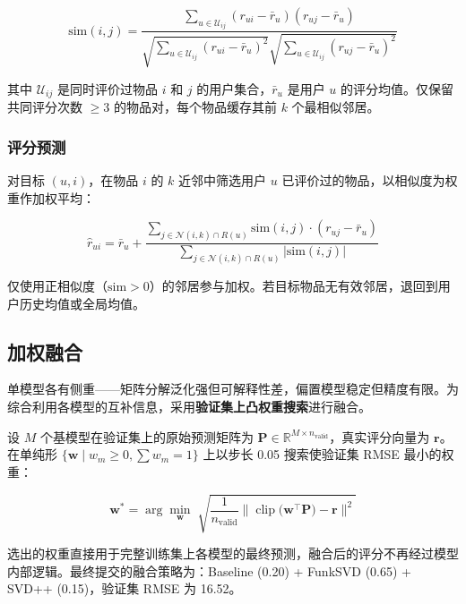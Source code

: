 \documentclass[UTF8,a4paper,10pt]{ctexart}
\begin{document}
\begin{equation}
    \text{sim}(i, j) = \frac{
        \sum_{u \in \mathcal{U}_{ij}} (r_{ui} - \bar{r}_u)(r_{uj} - \bar{r}_u)
    }{
        \sqrt{\sum_{u \in \mathcal{U}_{ij}} (r_{ui} - \bar{r}_u)^2}
        \sqrt{\sum_{u \in \mathcal{U}_{ij}} (r_{uj} - \bar{r}_u)^2}
    }
    \label{eq:knn_sim}
\end{equation}

其中 $\mathcal{U}_{ij}$ 是同时评价过物品 $i$ 和 $j$ 的用户集合，$\bar{r}_u$ 是用户 $u$ 的评分均值。仅保留共同评分次数 $\geq 3$ 的物品对，每个物品缓存其前 $k$ 个最相似邻居。

\subsubsection{评分预测}

对目标 $(u,i)$，在物品 $i$ 的 $k$ 近邻中筛选用户 $u$ 已评价过的物品，以相似度为权重作加权平均：

\begin{equation}
    \hat{r}_{ui} = \bar{r}_u + \frac{
        \sum_{j \in \mathcal{N}(i,k) \cap R(u)} \text{sim}(i,j) \cdot (r_{uj} - \bar{r}_u)
    }{
        \sum_{j \in \mathcal{N}(i,k) \cap R(u)} |\text{sim}(i,j)|
    }
    \label{eq:knn_pred}
\end{equation}

仅使用正相似度（$\text{sim} > 0$）的邻居参与加权。若目标物品无有效邻居，退回到用户历史均值或全局均值。

\subsection{加权融合}

单模型各有侧重——矩阵分解泛化强但可解释性差，偏置模型稳定但精度有限。为综合利用各模型的互补信息，采用\textbf{验证集上凸权重搜索}进行融合。

设 $M$ 个基模型在验证集上的原始预测矩阵为 $\mathbf{P} \in \mathbb{R}^{M \times n_{\text{valid}}}$，真实评分向量为 $\mathbf{r}$。在单纯形 $\{\mathbf{w} \mid w_m \ge 0, \sum w_m = 1\}$ 上以步长 0.05 搜索使验证集 RMSE 最小的权重：

\begin{equation}
    \mathbf{w}^* = \arg\min_{\mathbf{w}} \;
    \sqrt{\frac{1}{n_{\text{valid}}} \bigl\|
        \operatorname{clip}\bigl(\mathbf{w}^{\!\top} \mathbf{P}\bigr) - \mathbf{r}
    \bigr\|^2}
    \label{eq:ensemble}
\end{equation}

选出的权重直接用于完整训练集上各模型的最终预测，融合后的评分不再经过模型内部逻辑。最终提交的融合策略为：Baseline (0.20) + FunkSVD (0.65) + SVD++ (0.15)，验证集 RMSE 为 16.52。
\end{document}
